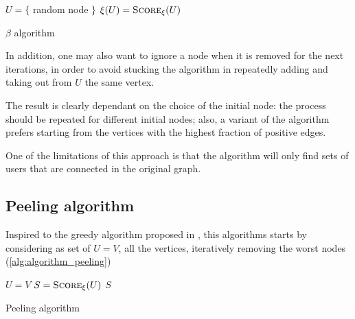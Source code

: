 \begin{algorithm}
	\SetAlgoLined
	$U = \{$ random node $\}$\;
	$\xi(U) = \textsc{Score}_{\xi}(U)$ \;
	\caption{$\beta$ algorithm}
	\label{alg:algorithm_beta}
\end{algorithm}

In addition, one may also want to ignore a node when it is removed for the
next iterations, in order to avoid stucking the algorithm in repeatedly adding
and taking out from $U$ the same vertex.

The result is clearly dependant on the choice of the initial node: the process
should be repeated for different initial nodes; also, a variant
of the algorithm prefers starting from the vertices with the highest fraction of positive edges.

One of the limitations of this approach is that the algorithm will only find
sets of users that are connected in the original graph.

\subsection{Peeling algorithm}%
\label{ssub:peeling_algorithm}

Inspired to the greedy algorithm proposed in \cite{charikar2000greedy}, this
algorithms starts by considering as set of $U = V$, all the vertices,
iteratively removing the worst nodes (\autoref{alg:algorithm_peeling})

\begin{algorithm}
	\SetAlgoLined
	$U = V$\;
	$S = \textsc{Score}_{\xi}(U)$ \;
	\Return $S$ \;

	\caption{Peeling algorithm}
	\label{alg:algorithm_peeling}
\end{algorithm}

